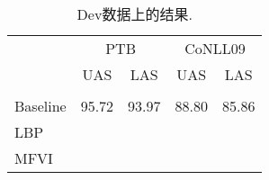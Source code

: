 \begin{table}[tb!]
  \centering
  \begin{tabular}{lcccc}
    \toprule
             & \multicolumn{2}{c}{PTB} & \multicolumn{2}{c}{CoNLL09}                 \\
             & UAS                     & LAS                         & UAS   & LAS   \\[2pt]
    \hline
    \\[-15pt]
    Baseline & 95.72                   & 93.97                       & 88.80 & 85.86 \\[3pt]
    LBP      &                         &                             &       &       \\
    MFVI     &                         &                             &       &       \\
    \bottomrule
  \end{tabular}
  \caption{Dev数据上的结果.}
  \label{table:dev-test}
\end{table}


